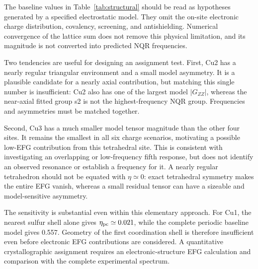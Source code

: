 The baseline values in Table~\ref{tab:structural} should be read as hypotheses generated by a specified electrostatic model. They omit the on-site electronic charge distribution, covalency, screening, and antishielding. Numerical convergence of the lattice sum does not remove this physical limitation, and its magnitude is not converted into predicted NQR frequencies.

Two tendencies are useful for designing an assignment test. First, Cu2 has a nearly regular triangular environment and a small model asymmetry. It is a plausible candidate for a nearly axial contribution, but matching this single number is insufficient: Cu2 also has one of the largest model $|G_{ZZ}|$, whereas the near-axial fitted group s2 is not the highest-frequency NQR group. Frequencies and asymmetries must be matched together.

Second, Cu3 has a much smaller model tensor magnitude than the other four sites. It remains the smallest in all six charge scenarios, motivating a possible low-EFG contribution from this tetrahedral site. This is consistent with investigating an overlapping or low-frequency fifth response, but does not identify an observed resonance or establish a frequency for it. A nearly regular tetrahedron should not be equated with $\eta\simeq0$: exact tetrahedral symmetry makes the entire EFG vanish, whereas a small residual tensor can have a sizeable and model-sensitive asymmetry.

The sensitivity is substantial even within this elementary approach. For Cu1, the nearest sulfur shell alone gives $\eta_{\rm pc}\simeq0.021$, while the complete periodic baseline model gives 0.557. Geometry of the first coordination shell is therefore insufficient even before electronic EFG contributions are considered. A quantitative crystallographic assignment requires an electronic-structure EFG calculation and comparison with the complete experimental spectrum.
